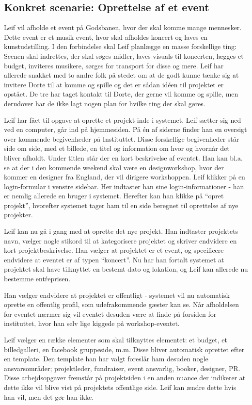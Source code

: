 \subsection{Konkret scenarie: Oprettelse af et event}
Leif vil afholde et event på Godsbanen, hvor der skal komme mange mennesker. Dette event er et musik event, hvor skal afholdes koncert og laves en kunstudstilling. I den forbindelse skal Leif planlægge en masse forskellige ting: Scenen skal indrettes, der skal søges midler, laves visuals til koncerten, lægges et budget, inviteres musikere, sørges for transport for disse og mere.
Leif har allerede snakket med to andre folk på stedet om at de godt kunne tænke sig at invitere Dorte til at komme og spille og det er sådan idéen til projektet er opstået. De tre har taget kontakt til Dorte, der gerne vil komme og spille, men derudover har de ikke lagt nogen plan for hvilke ting der skal gøres.

Leif har fået til opgave at oprette et projekt inde i systemet. Leif sætter sig ned ved en computer, går ind på hjemmesiden. På én af siderne finder han en oversigt over kommende begivenheder på Instituttet. Disse forskellige begivenheder står side om side, med et billede, en titel og information om hvor og hvornår det bliver afholdt. Under titlen står der en kort beskrivelse af eventet. Han kan bl.a. se at der i den kommende weekend skal være en designworkshop, hvor der kommer en designer fra England, der vil dirigere workshoppen. 
Leif klikker på en login-formular i venstre sidebar. Her indtaster han sine login-informationer - han er nemlig allerede en bruger i systemet. Herefter kan han klikke på “opret projekt”, hvorefter systemet tager ham til en side beregnet til oprettelse af nye projekter. 

Leif kan nu gå i gang med at oprette det nye projekt. Han indtaster projektets navn, vælger nogle stikord til at kategorisere projektet og skriver endvidere en kort projektbeskrivelse.
Han vælger at projektet er et event, og specificere endvidere at eventet er af typen “koncert”. Nu har han fortalt systemet at projektet skal have tilknyttet en bestemt dato og lokation, og Leif kan allerede nu bestemme entŕeprisen. 

Han vælger endvidere at projektet er offentligt - systemet vil nu automatisk oprette en offentlig profil, som udefrakommende gæster kan se. Når afholdelsen for eventet nærmer sig vil eventet desuden være at finde på forsiden for instituttet, hvor han selv lige kiggede på workshop-eventet.

Leif vælger en række elementer som skal tilknyttes elementet: et budget, et billedgalleri, en facebook gruppeside, m.m. Disse bliver automatisk oprettet efter en template.
Den template han har valgt foreslår ham desuden nogle ansvarsområder; projektleder, fundraiser, event ansvarlig, booker, designer, PR. Disse arbejdsopgaver fremstår på projektsiden i en anden nuance der indikerer at dette ikke vil blive vist på projektets offentlige side. Leif kan ændre dette hvis han vil, men det gør han ikke. 


